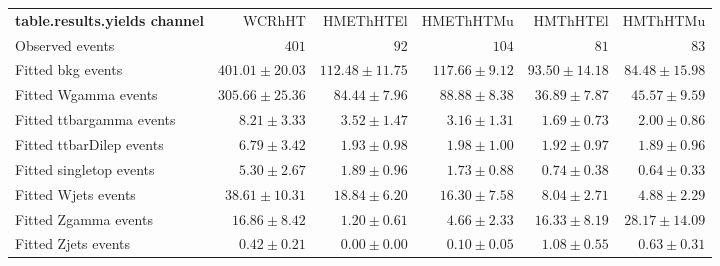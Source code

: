 

\begin{table}
\begin{center}
\setlength{\tabcolsep}{0.0pc}
{\small
\begin{tabular*}{\textwidth}{@{\extracolsep{\fill}}lrrrrr}
\noalign{\smallskip}\hline\noalign{\smallskip}
{\bf table.results.yields channel}           & WCRhHT            & HMEThHTEl            & HMEThHTMu            & HMThHTEl            & HMThHTMu              \\[-0.05cm]
\noalign{\smallskip}\hline\noalign{\smallskip}
Observed events          & $401$              & $92$              & $104$              & $81$              & $83$                    \\
\noalign{\smallskip}\hline\noalign{\smallskip}
Fitted bkg events         & $401.01 \pm 20.03$          & $112.48 \pm 11.75$          & $117.66 \pm 9.12$          & $93.50 \pm 14.18$          & $84.48 \pm 15.98$              \\
\noalign{\smallskip}\hline\noalign{\smallskip}
        Fitted Wgamma events         & $305.66 \pm 25.36$          & $84.44 \pm 7.96$          & $88.88 \pm 8.38$          & $36.89 \pm 7.87$          & $45.57 \pm 9.59$              \\
        Fitted ttbargamma events         & $8.21 \pm 3.33$          & $3.52 \pm 1.47$          & $3.16 \pm 1.31$          & $1.69 \pm 0.73$          & $2.00 \pm 0.86$              \\
        Fitted ttbarDilep events         & $6.79 \pm 3.42$          & $1.93 \pm 0.98$          & $1.98 \pm 1.00$          & $1.92 \pm 0.97$          & $1.89 \pm 0.96$              \\
        Fitted singletop events         & $5.30 \pm 2.67$          & $1.89 \pm 0.96$          & $1.73 \pm 0.88$          & $0.74 \pm 0.38$          & $0.64 \pm 0.33$              \\
        Fitted Wjets events         & $38.61 \pm 10.31$          & $18.84 \pm 6.20$          & $16.30 \pm 7.58$          & $8.04 \pm 2.71$          & $4.88 \pm 2.29$              \\
        Fitted Zgamma events         & $16.86 \pm 8.42$          & $1.20 \pm 0.61$          & $4.66 \pm 2.33$          & $16.33 \pm 8.19$          & $28.17 \pm 14.09$              \\
        Fitted Zjets events         & $0.42 \pm 0.21$          & $0.00 \pm 0.00$          & $0.10 \pm 0.05$          & $1.08 \pm 0.55$          & $0.63 \pm 0.31$              \\

\end{tabular*}}
\end{center}
\end{table}

